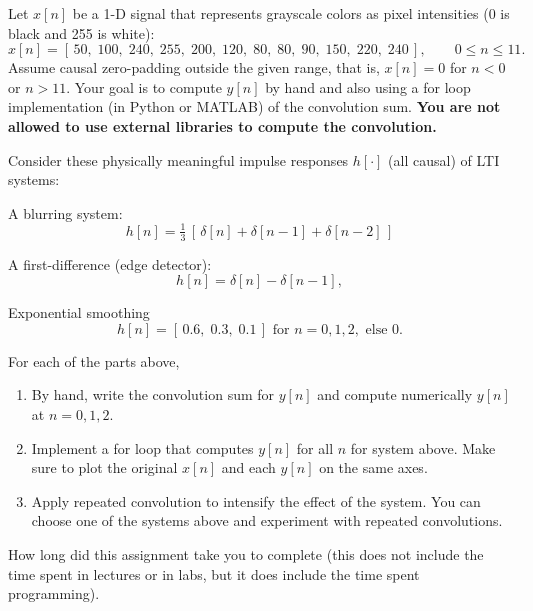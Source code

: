\documentclass{ee102_pset}
\author{\rule{3cm}{0.4pt}} %
\begin{document}



Let $x[n]$ be a 1-D signal that represents grayscale colors as pixel intensities (0 is black and 255 is white):
\[
x[n] = [\,50,\;100,\;240,\;255,\;200,\;120,\;80,\;80,\;90,\;150,\;220,\;240\,],
\qquad 0\le n\le 11.
\]
Assume causal zero-padding outside the given range, that is, $x[n]=0$ for $n<0$ or $n>11$. Your goal is to compute $y[n]$ by hand and also using a for loop implementation (in Python or MATLAB) of the convolution sum. \textbf{You are not allowed to use external libraries to compute the convolution.}

Consider these physically meaningful impulse responses $h[\cdot]$ (all causal) of LTI systems:

\problempart [12 points] A blurring system:
\[
h[n]=\tfrac13\,[\,\delta[n]+\delta[n-1]+\delta[n-2]\,]
\]

\problempart [12 points] A first-difference (edge detector):
\[
h[n]=\delta[n]-\delta[n-1],
\]

\problempart [12 points] Exponential smoothing
\[
h[n]=[\,0.6,\;0.3,\;0.1\,]\text{ for }n=0,1,2, \text{ else }0.
\]

For each of the parts above, 
\begin{enumerate}
  \item By hand, write the convolution sum for $y[n]$ and compute numerically $y[n]$ at $n=0,1,2$.
  \item Implement a for loop that computes $y[n]$ for all $n$ for system above. Make sure to plot the original $x[n]$ and each $y[n]$ on the same axes.
  \item Apply repeated convolution to intensify the effect of the system. You can choose one of the systems above and experiment with repeated convolutions.
\end{enumerate}

\problempart [1 point] How long did this assignment take you to complete (this does not include the time spent in lectures or in labs, but it does include the time spent programming).
\end{document}
